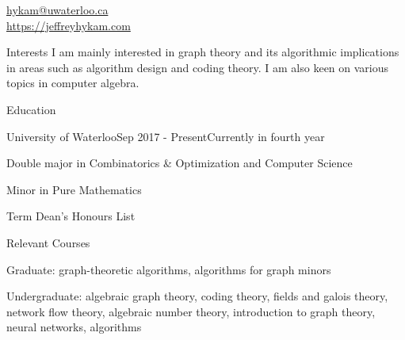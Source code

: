 \documentclass{cv}
\begin{document}

\href{hykam@uwaterloo.ca}{hykam@uwaterloo.ca} \\
\href{https://jeffreyhykam.com}{https://jeffreyhykam.com}

\begin{rSection}{Interests}
	I am mainly interested in graph theory and its algorithmic implications in areas such as 
	algorithm design and coding theory. I am also keen on various topics in computer algebra.
\end{rSection}

\begin{rSection}{Education}
\begin{rSubsection}{University of Waterloo}{Sep 2017 - Present}{Currently in fourth year}{}
	\item Double major in Combinatorics \& Optimization and Computer Science
	\item Minor in Pure Mathematics
	\item Term Dean's Honours List
\end{rSubsection}

\begin{rSubsection}{Relevant Courses}{}{}{}
	\item Graduate: graph-theoretic algorithms, algorithms for graph minors
	\item Undergraduate: algebraic graph theory, coding theory, fields and galois theory, network flow theory, 
	algebraic number theory, introduction to graph theory, neural networks, algorithms
\end{rSubsection}
\end{rSection}
\end{document}
